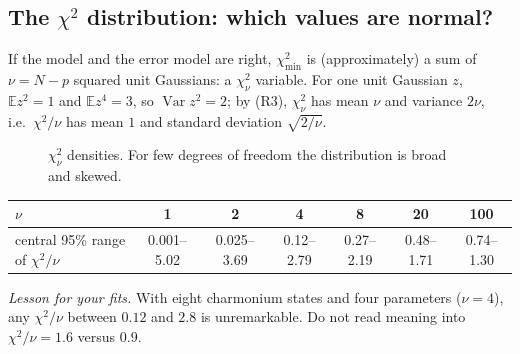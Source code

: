 \documentclass[11pt,a4paper]{article}
\numberwithin{equation}{section}
\theoremstyle{definition}
\theoremstyle{plain}
\theoremstyle{remark}
\numberwithin{algorithm}{section}
\begin{document}
\subsection{\texorpdfstring{The $\chi^2$ distribution: which values are normal?}{The chi-squared distribution: which values are normal?}}\label{sec:pr-chi2dist}
If the model and the error model are right, $\chi^2_{\min}$ is (approximately) a sum of $\nu=N-p$ squared unit Gaussians: a $\chi^2_\nu$ variable. For one unit Gaussian $z$, $\mathbb E z^2=1$ and $\mathbb E z^4=3$, so $\operatorname{Var}z^2=2$; by (R3), $\chi^2_\nu$ has mean $\nu$ and variance $2\nu$, i.e.\ $\chi^2/\nu$ has mean $1$ and standard deviation $\sqrt{2/\nu}$.

\begin{figure}[h]\centering
{}
\caption{$\chi^2_\nu$ densities. For few degrees of freedom the distribution is broad and skewed.}\label{fig:pr-chi2}
\end{figure}

\begin{center}\small
\begin{tabular}{@{}lcccccc@{}}\toprule
$\nu$ & 1 & 2 & 4 & 8 & 20 & 100\\\midrule
central 95\% range of $\chi^2/\nu$ & 0.001--5.02 & 0.025--3.69 & 0.12--2.79 & 0.27--2.19 & 0.48--1.71 & 0.74--1.30\\\bottomrule
\end{tabular}
\end{center}
\emph{Lesson for your fits.} With eight charmonium states and four parameters ($\nu=4$), any $\chi^2/\nu$ between $0.12$ and $2.8$ is unremarkable. Do not read meaning into $\chi^2/\nu=1.6$ versus $0.9$.
\end{document}
